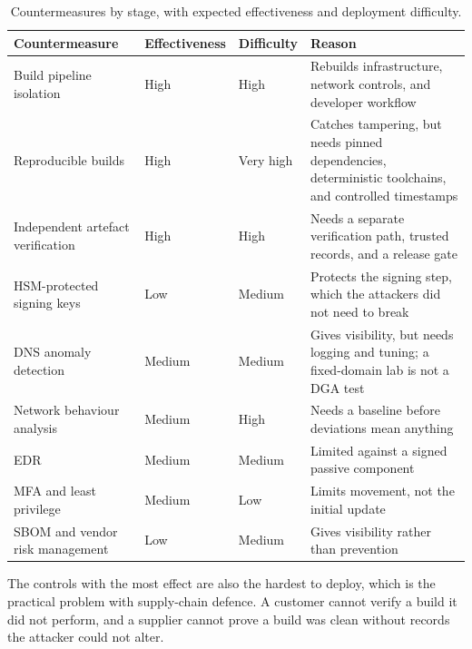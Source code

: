 \begin{table}[H]
\centering
\footnotesize
{}
\caption{Countermeasures by stage, with expected effectiveness and deployment difficulty.}
\label{tab:countermeasures}
\begin{tabular}{@{}>{\RaggedRight}p{3.5cm}>{\RaggedRight}p{2.4cm}>{\RaggedRight}p{2.1cm}>{\RaggedRight}p{6.6cm}@{}}
\toprule
\textbf{Countermeasure} & \textbf{Effectiveness} & \textbf{Difficulty} & \textbf{Reason} \\
\midrule
Build pipeline isolation & High & High & Rebuilds infrastructure, network controls, and developer workflow \\
Reproducible builds & High & Very high & Catches tampering, but needs pinned dependencies, deterministic toolchains, and controlled timestamps \\
Independent artefact verification & High & High & Needs a separate verification path, trusted records, and a release gate \\
HSM-protected signing keys & Low & Medium & Protects the signing step, which the attackers did not need to break \\
DNS anomaly detection & Medium & Medium & Gives visibility, but needs logging and tuning; a fixed-domain lab is not a DGA test \\
Network behaviour analysis & Medium & High & Needs a baseline before deviations mean anything \\
EDR & Medium & Medium & Limited against a signed passive component \\
MFA and least privilege & Medium & Low & Limits movement, not the initial update \\
SBOM and vendor risk management & Low & Medium & Gives visibility rather than prevention \\
\bottomrule
\end{tabular}
\end{table}

The controls with the most effect are also the hardest to deploy, which is the practical problem with supply-chain defence. A customer cannot verify a build it did not perform, and a supplier cannot prove a build was clean without records the attacker could not alter.
